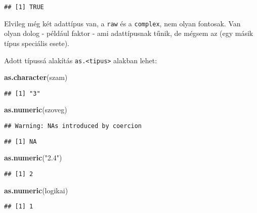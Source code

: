 \documentclass[
]{book}
\newenvironment{Shaded}{\begin{snugshade}}{\end{snugshade}}
\newcommand{\KeywordTok}[1]{\textcolor[rgb]{0.13,0.29,0.53}{\textbf{#1}}}
\newcommand{\NormalTok}[1]{#1}
\newcommand{\StringTok}[1]{\textcolor[rgb]{0.31,0.60,0.02}{#1}}
\begin{document}
\begin{verbatim}
## [1] TRUE
\end{verbatim}

Elvileg még két adattípus van, a \texttt{raw} és a \texttt{complex}, nem olyan fontosak. Van olyan dolog - például faktor - ami adattípusnak tűnik, de mégsem az (egy másik típus speciális esete).

Adott típussá alakítás \texttt{as.\textless{}tipus\textgreater{}} alakban lehet:

\begin{Shaded}
\begin{Highlighting}[]
\KeywordTok{as.character}\NormalTok{(szam)}
\end{Highlighting}
\end{Shaded}

\begin{verbatim}
## [1] "3"
\end{verbatim}

\begin{Shaded}
\begin{Highlighting}[]
\KeywordTok{as.numeric}\NormalTok{(szoveg)}
\end{Highlighting}
\end{Shaded}

\begin{verbatim}
## Warning: NAs introduced by coercion
\end{verbatim}

\begin{verbatim}
## [1] NA
\end{verbatim}

\begin{Shaded}
\begin{Highlighting}[]
\KeywordTok{as.numeric}\NormalTok{(}\StringTok{"2.4"}\NormalTok{)}
\end{Highlighting}
\end{Shaded}

\begin{verbatim}
## [1] 2
\end{verbatim}

\begin{Shaded}
\begin{Highlighting}[]
\KeywordTok{as.numeric}\NormalTok{(logikai)}
\end{Highlighting}
\end{Shaded}

\begin{verbatim}
## [1] 1
\end{verbatim}
\end{document}
